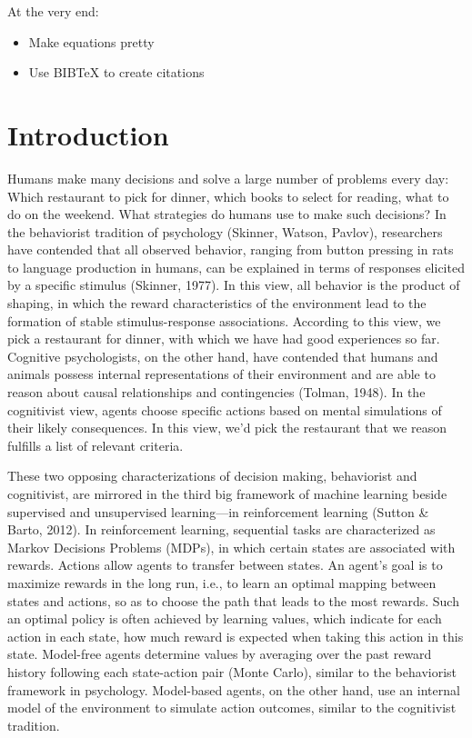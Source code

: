 \documentclass[11pt]{article} %
\begin{document}
At the very end:
\begin{itemize}
	\item Make equations pretty
	\item Use BIBTeX to create citations
\end{itemize}

\section{Introduction}

Humans make many decisions and solve a large number of problems every day: Which restaurant to pick for dinner, which books to select for reading, what to do on the weekend. What strategies do humans use to make such decisions? In the behaviorist tradition of psychology (Skinner, Watson, Pavlov), researchers have contended that all observed behavior, ranging from button pressing in rats to language production in humans, can be explained in terms of responses elicited by a specific stimulus (Skinner, 1977). In this view, all behavior is the product of shaping, in which the reward characteristics of the environment lead to the formation of stable stimulus-response associations. According to this view, we pick a restaurant for dinner, with which we have had good experiences so far. Cognitive psychologists, on the other hand, have contended that humans and animals possess internal representations of their environment and are able to reason about causal relationships and contingencies (Tolman, 1948). In the cognitivist view, agents choose specific actions based on mental simulations of their likely consequences. In this view, we'd pick the restaurant that we reason fulfills a list of relevant criteria.

These two opposing characterizations of decision making, behaviorist and cognitivist, are mirrored in the third big framework of machine learning beside supervised and unsupervised learning---in reinforcement learning (Sutton \& Barto, 2012). In reinforcement learning, sequential tasks are characterized as Markov Decisions Problems (MDPs), in which certain states are associated with rewards. Actions allow agents to transfer between states. An agent's goal is to maximize rewards in the long run, i.e., to learn an optimal mapping between states and actions, so as to choose the path that leads to the most rewards. Such an optimal policy is often achieved by learning values, which indicate for each action in each state, how much reward is expected when taking this action in this state. Model-free agents determine values by averaging over the past reward history following each state-action pair (Monte Carlo), similar to the behaviorist framework in psychology. Model-based agents, on the other hand, use an internal model of the environment to simulate action outcomes, similar to the cognitivist tradition.
\end{document}
